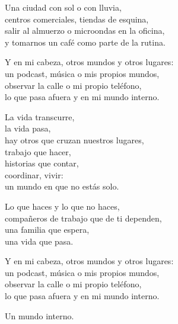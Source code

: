 \begin{lyrics}
Una ciudad con sol o con lluvia,\\
centros comerciales, tiendas de esquina,\\
salir al almuerzo o microondas en la oficina,\\
y tomarnos un café como parte de la rutina.

Y en mi cabeza, otros mundos y otros lugares:\\
un podcast, música o mis propios mundos,\\
observar la calle o mi propio teléfono,\\
lo que pasa afuera y en mi mundo interno.

La vida transcurre,\\
la vida pasa,\\
hay otros que cruzan nuestros lugares,\\
trabajo que hacer,\\
historias que contar,\\
coordinar, vivir:\\
un mundo en que no estás solo.

Lo que haces y lo que no haces,\\
compañeros de trabajo que de ti dependen,\\
una familia que espera,\\
una vida que pasa.

Y en mi cabeza, otros mundos y otros lugares:\\
un podcast, música o mis propios mundos,\\
observar la calle o mi propio teléfono,\\
lo que pasa afuera y en mi mundo interno.

Un mundo interno.
\end{lyrics}

